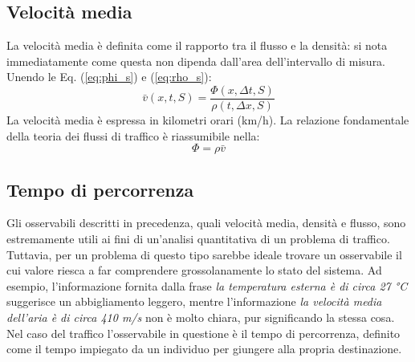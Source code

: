 \documentclass[../main.tex]{subfiles}
\begin{document}
\subsection{Velocit\`a media}
La velocit\`a media \`e definita come il rapporto tra il flusso e la densit\`a: si nota immediatamente come questa non dipenda dall'area dell'intervallo di misura.
Unendo le Eq. (\ref{eq:phi_s}) e (\ref{eq:rho_s}):
\begin{equation}
    \bar{v}(x, t, S)=\frac{\Phi(x, \Delta t, S)}{\rho(t,\Delta x, S)}
\end{equation}
La velocit\`a media \`e espressa in kilometri orari (km/h).
La relazione fondamentale della teoria dei flussi di traffico \`e riassumibile nella:
\begin{equation}
    \Phi=\rho\bar{v}
    \label{eq:fundamental}
\end{equation}

\subsection{Tempo di percorrenza}
Gli osservabili descritti in precedenza, quali velocit\`a media, densit\`a e flusso, sono estremamente utili ai fini di un'analisi quantitativa di un problema di traffico.
Tuttavia, per un problema di questo tipo sarebbe ideale trovare un osservabile il cui valore riesca a far comprendere grossolanamente lo stato del sistema.
Ad esempio, l'informazione fornita dalla frase \emph{la temperatura esterna \`e di circa 27 °C} suggerisce un abbigliamento leggero, mentre l'informazione \emph{la velocit\`a media dell'aria \`e di circa 410 m/s} non \`e molto chiara, pur significando la stessa cosa.
Nel caso del traffico l'osservabile in questione \`e il tempo di percorrenza, definito come il tempo impiegato da un individuo per giungere alla propria destinazione.
\end{document}
